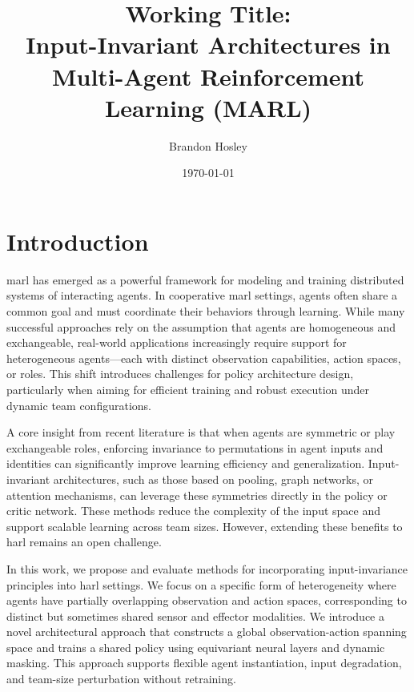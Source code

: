 \documentclass{article}
\title{Working Title: \\
Input-Invariant Architectures in Multi-Agent Reinforcement Learning (MARL)}
\author{Brandon Hosley}
\date{\today}
\begin{document}
\maketitle


\section{Introduction}

\Gls{marl} has emerged as a powerful framework for modeling and 
training distributed systems of interacting agents. 
In cooperative \gls{marl} settings, agents often share a common goal and 
must coordinate their behaviors through learning. 
While many successful approaches rely on the assumption that agents are 
homogeneous and exchangeable, real-world applications increasingly 
require support for heterogeneous agents—each with distinct observation capabilities, 
action spaces, or roles. 
This shift introduces challenges for policy architecture design, 
particularly when aiming for efficient training and robust 
execution under dynamic team configurations.

A core insight from recent literature is that when agents are symmetric or 
play exchangeable roles, enforcing invariance to permutations in agent inputs 
and identities can significantly improve learning efficiency and generalization. 
Input-invariant architectures, such as those based on pooling, graph networks, 
or attention mechanisms, can leverage these symmetries directly in the 
policy or critic network. These methods reduce the complexity of the 
input space and support scalable learning across team sizes. 
However, extending these benefits to \gls{harl} remains an open challenge.

In this work, we propose and evaluate methods for incorporating 
input-invariance principles into \gls{harl} settings. 
We focus on a specific form of heterogeneity where agents 
have partially overlapping observation and action spaces, 
corresponding to distinct but sometimes shared sensor and effector modalities. 
We introduce a novel architectural approach that constructs a 
global observation-action spanning space and trains a 
shared policy using equivariant neural layers and dynamic masking. 
This approach supports flexible agent instantiation, input degradation, 
and team-size perturbation without retraining.
\end{document}
